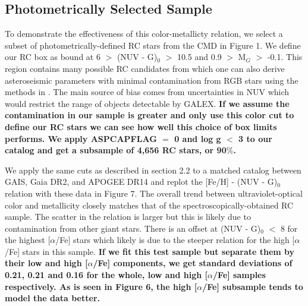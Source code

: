 \documentclass[twocolumn]{emulateapj}
\begin{document}
\subsection{Photometrically Selected Sample}
To demonstrate the effectiveness of this color-metallicty relation, we select a subset of photometrically-defined RC stars from the CMD in Figure 1. We define our RC box as bound at 6 $>$ (NUV - G)$_0$ $>$ 10.5 and 0.9 $>$ M$_G$ $>$ -0.1. This region contains many possible RC candidates from which one can also derive asteroseismic parameters with minimal contamination from RGB stars using the methods in \citealt{hawkins18}. The main source of bias comes from uncertainties in NUV which would restrict the range of objects detectable by GALEX. \textbf{If we assume the contamination in our sample is greater and only use this color cut to define our RC stars we can see how well this choice of box limits performs. We apply ASPCAPFLAG $=$ 0 and log g $<$ 3 to our catalog and get a subsample of 4,656 RC stars, or 90$\%$.}

We apply the same cuts as described in section 2.2 to a matched catalog between GAIS, Gaia DR2, and APOGEE DR14 and replot the [Fe/H] - (NUV - G)$_0$ relation with these data in Figure 7. The overall trend between ultraviolet-optical color and metallicity closely matches that of the spectroscopically-obtained RC sample. The scatter in the relation is larger but this is likely due to contamination from other giant stars. There is an offset at (NUV - G)$_0$ $<$ 8 for the highest [$\alpha$/Fe] stars which likely is due to the steeper relation for the high [$\alpha$/Fe] stars in this sample. \textbf{If we fit this test sample but separate them by their low and high [$\alpha$/Fe] components, we get standard deviations of 0.21, 0.21 and 0.16 for the whole, low and high [$\alpha$/Fe] samples respectively. As is seen in Figure 6, the high [$\alpha$/Fe] subsample tends to model the data better.}
\end{document}
